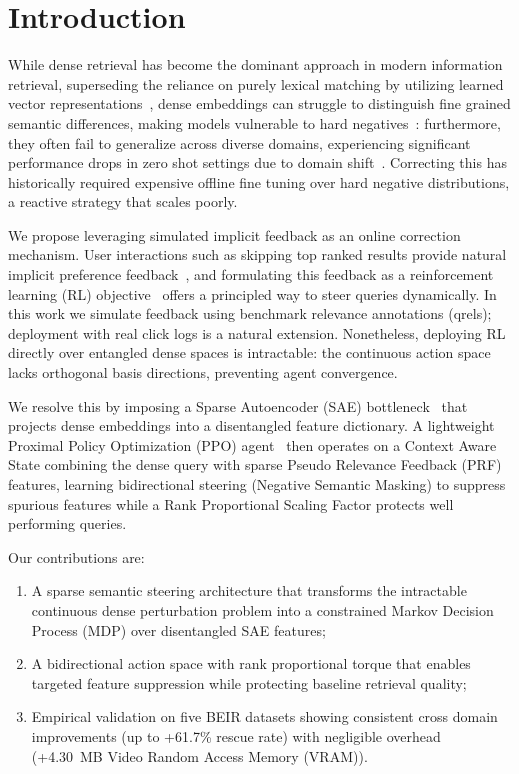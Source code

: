 \documentclass[sigconf]{acmart}
\begin{document}
\maketitle

\section{Introduction}

While dense retrieval has become the dominant approach in modern information retrieval, superseding the reliance on purely lexical matching by utilizing learned vector representations~\cite{karpukhin2020, izacard2022}, dense embeddings can struggle to distinguish fine grained semantic differences, making models vulnerable to hard negatives~\cite{zhan2021}: furthermore, they often fail to generalize across diverse domains, experiencing significant performance drops in zero shot settings due to domain shift~\cite{thakur2021}. Correcting this has historically required expensive offline fine tuning over hard negative distributions, a reactive strategy that scales poorly.

We propose leveraging simulated implicit feedback as an online correction mechanism. User interactions such as skipping top ranked results provide natural implicit preference feedback~\cite{joachims2002}, and formulating this feedback as a reinforcement learning (RL) objective~\cite{afsar2022, christiano2017} offers a principled way to steer queries dynamically. In this work we simulate feedback using benchmark relevance annotations (qrels); deployment with real click logs is a natural extension. Nonetheless, deploying RL directly over entangled dense spaces is intractable: the continuous action space lacks orthogonal basis directions, preventing agent convergence.

We resolve this by imposing a Sparse Autoencoder (SAE) bottleneck~\cite{huben2024, bricken2023} that projects dense embeddings into a disentangled feature dictionary. A lightweight Proximal Policy Optimization (PPO) agent~\cite{schulman2017} then operates on a Context Aware State combining the dense query with sparse Pseudo Relevance Feedback (PRF) features, learning bidirectional steering (Negative Semantic Masking) to suppress spurious features while a Rank Proportional Scaling Factor protects well performing queries.

Our contributions are:
\begin{enumerate}
\item A sparse semantic steering architecture that transforms the intractable continuous dense perturbation problem into a constrained Markov Decision Process (MDP) over disentangled SAE features;
\item A bidirectional action space with rank proportional torque that enables targeted feature suppression while protecting baseline retrieval quality;
\item Empirical validation on five BEIR datasets showing consistent cross domain improvements (up to +61.7\% rescue rate) with negligible overhead (+4.30~MB Video Random Access Memory (VRAM)).
\end{enumerate}
\end{document}
